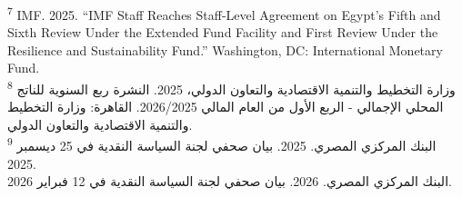 \textsuperscript{7} IMF. 2025. ``IMF Staff Reaches Staff-Level Agreement on Egypt's Fifth and Sixth Review Under the Extended Fund Facility and First Review Under the Resilience and Sustainability Fund.'' Washington, DC: International Monetary Fund.\\
\textsuperscript{8} وزارة التخطيط والتنمية الاقتصادية والتعاون الدولي، 2025. النشرة ربع السنوية للناتج المحلي الإجمالي - الربع الأول من العام المالي 2026/2025. القاهرة: وزارة التخطيط والتنمية الاقتصادية والتعاون الدولي.\\
\textsuperscript{9} البنك المركزي المصري. 2025. بيان صحفي لجنة السياسة النقدية في 25 ديسمبر 2025.\\
البنك المركزي المصري. 2026. بيان صحفي لجنة السياسة النقدية في 12 فبراير 2026.
